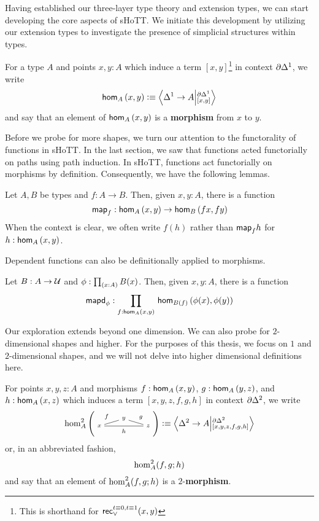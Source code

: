 \documentclass[main.tex]{subfiles}
\begin{document}
Having established our three-layer type theory and extension types, we can start developing the core aspects of sHoTT. We initiate this development by utilizing our extension types to investigate the presence of simplicial structures within types.

\begin{definition}
    For a type $A$ and points $x,y : A$ which induce a term $[x,y]$\footnote{This is shorthand for $\recOr{t \equiv 0, t \equiv 1}{x}{y}$} in context $\pardo$, we write
    $$\ho[A]{x}{y} \defeq \ndexten{\osx}{A}{\pardo}{[x,y]}$$
    and say that an element of $\ho[A]{x}{y}$ is a \textbf{morphism} from $x$ to $y$. 
\end{definition}

Before we probe for more shapes, we turn our attention to the functorality of functions in sHoTT. In the last section, we saw that functions acted functorially on paths using path induction. In sHoTT, functions act functorially on morphisms by definition.
Consequently, we have the following lemmas.
\begin{lemma}
    Let $A,B$ be types and $f : A \to B$. Then, given $x,y : A$, there is a function 
    \[\mapfunc{f} : \ho[A]{x}{y} \to \ho[B]{f x}{f y}\]
    When the context is clear, we often write $f(h)$ rather than $\mapfunc{f}h$ for $h : \ho[A]{x}{y}$.
\end{lemma}
Dependent functions can also be definitionally applied to morphisms.
\begin{lemma}
    Let $B : A \to \U$ and $\phi : \prd{x : A}B(x)$. Then, given $x,y : A$, there is a function
    $$\mapdepfunc{\phi} : \prd{f : \ho[A]{x}{y}}\ho[B(f)]{\phi(x)}{\phi(y)}$$
\end{lemma}
Our exploration extends beyond one dimension. We can also probe for $2$-dimensional shapes and higher. For the purposes of this thesis, we focus on $1$ and $2$-dimensional shapes, and we will not delve into higher dimensional definitions here.
\begin{definition}
    For points $x,y,z : A$ and morphisms $f : \ho[A]{x}{y}$, $g : \ho[A]{y}{z}$, and $h : \ho[A]{x}{z}$ which induces a term $[x,y,z,f,g,h]$ in context $\pardt$, we write
    $$\homtwo{A}(x,y,z,f,g,h) \defeq \ndexten{\tsx}{A}{\pardt}{[x,y,z,f,g,h]}$$
    or, in an abbreviated fashion,
    $$\homtwoshort{A}(x,y,z,f,g,h)$$
    and say that an element of $\homtwoshort{A}(x,y,z,f,g,h)$ is a $2$-\textbf{morphism}.
\end{definition}
\end{document}
